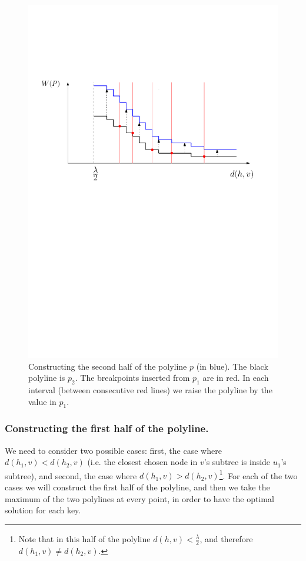 \documentclass[a4paper,UKenglish]{lipics-v2016}
\theoremstyle{plain}
\begin{document}
\begin{figure}[h]
\begin{center}
\includegraphics[scale=.55]{new_polyline_second_half}
\end{center}
\caption{Constructing the second half of the polyline $p$ (in blue). The black polyline is $p_2$. The breakpoints inserted from $p_1$ are in red. In each interval (between consecutive red lines) we raise the polyline by the value in $p_1$.
\label{figure of constructing the second half of the polyline}}
\end{figure}

\subsubsection{Constructing the first half of the polyline.} We need to consider two possible cases: first, the case where $d(h_1,v) < d(h_2,v)$ (i.e. the closest chosen node in $v$'s subtree is inside $u_1$'s subtree), and second, the case where $d(h_1,v) > d(h_2,v)$\footnote{Note that in this half of the polyline $d(h,v)<\frac{\lambda}{2}$, and therefore $d(h_1,v) \neq d(h_2,v)$.}. For each of the two cases we will construct the first half of the polyline, and then we take the maximum of the two polylines at every point, in order to have the optimal solution for each key.
\end{document}
